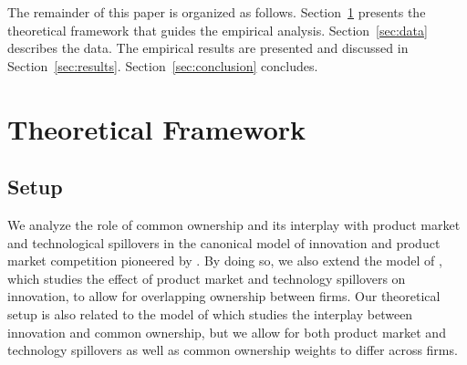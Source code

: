 \documentclass[12pt]{article}
\begin{document}
The remainder of this paper is organized as follows. Section~\ref{sec:model} presents the theoretical framework that guides the empirical analysis. Section~\ref{sec:data} describes the data. The empirical results are presented and discussed in Section~\ref{sec:results}. Section~\ref{sec:conclusion} concludes.

%
%
%


\section{Theoretical Framework} 
\label{sec:model}

\subsection{Setup}

We analyze the role of common ownership and its interplay with product market and technological spillovers in the canonical model of innovation and product market competition pioneered by \cite{daspremont1988}. By doing so, we also extend the model of \cite{bloom2013}, which studies the effect of product market and technology spillovers on innovation, to allow for overlapping ownership between firms. Our theoretical setup is also related to the model of \cite{lopez2016cross} which studies the interplay between innovation and common ownership, but we allow for both product market and technology spillovers as well as common ownership weights to differ across firms. 
\end{document}
